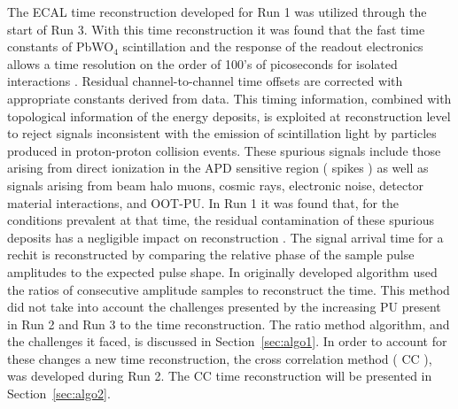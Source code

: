 The ECAL time reconstruction developed for Run 1 was utilized through the start of Run 3.  With this time reconstruction it was found that the fast time constants of PbWO$_{4}$ scintillation and the response of the readout electronics allows a time resolution on the order of 100's of picoseconds for isolated interactions \cite{Collaboration_2010}.  Residual channel-to-channel time offsets are corrected with appropriate constants derived from data. This timing information, combined with topological information of the energy deposits, is exploited at reconstruction level to reject signals inconsistent with the emission of scintillation light by particles produced in proton-proton collision events. These spurious signals include those arising from direct ionization in the APD sensitive region ( spikes ) as well as signals arising from beam halo muons, cosmic rays, electronic noise, detector material interactions, and OOT-PU. In Run 1 it was found that, for the conditions prevalent at that time, the residual contamination of these spurious deposits has a negligible impact on reconstruction \cite{CMS-NOTE-2010-012}. The signal arrival time for a rechit is reconstructed  by comparing the relative phase of the sample pulse amplitudes to the expected pulse shape. In originally developed algorithm used the ratios of consecutive amplitude samples to reconstruct the time.  This method did not take into account the challenges presented by the increasing PU present in Run 2 and Run 3 to the time reconstruction. The ratio method algorithm, and the challenges it faced, is discussed in Section~\ref{sec:algo1}. In order to account for these changes a new time reconstruction, the cross correlation method ( CC ), was developed during Run 2.  The CC time reconstruction will be  presented in Section~\ref{sec:algo2}.
 
